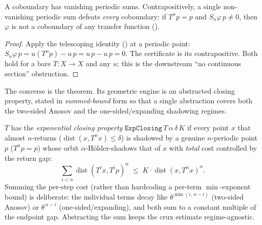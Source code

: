 \begin{theorem}\label{thm:livsic-trivial}
  \leanok
  A coboundary has vanishing periodic sums. Contrapositively, a single non-vanishing periodic sum
  defeats \emph{every} coboundary: if \(T^n p = p\) and \(S_n\varphi\,p\ne 0\), then \(\varphi\) is
  not a coboundary of any transfer function
  ().
\end{theorem}
\begin{proof}\leanok
  Apply the telescoping identity () at a periodic point:
  \(S_n\varphi\,p = u(T^n p) - u\,p = u\,p - u\,p = 0\). The certificate is its contrapositive.
  Both hold for a bare \(T:X\to X\) and any \(u\); this is the downstream ``no continuous section''
  obstruction.
\end{proof}

The converse is the theorem. Its geometric engine is an abstracted closing property, stated in
\emph{summed-bound} form so that a single abstraction covers both the two-sided Anosov and the
one-sided/expanding shadowing regimes.

\begin{definition}\label{def:livsic-expclosing}
  \leanok
  \(T\) has the \emph{exponential closing property} \(\texttt{ExpClosing}\,T\,\alpha\,\delta\,K\) if
  every point \(x\) that almost \(n\)-returns (\(\operatorname{dist}(x,T^n x)\le\delta\)) is shadowed by a genuine
  \(n\)-periodic point \(p\) (\(T^n p = p\)) whose orbit \(\alpha\)-Hölder-shadows that of \(x\) with
  \emph{total} cost controlled by the return gap:
  \[
    \sum_{i<n}\operatorname{dist}(T^i x, T^i p)^{\alpha} \;\le\; K\cdot\operatorname{dist}(x,T^n x)^{\alpha}.
  \]
  Summing the per-step cost (rather than hardcoding a per-term \(\min\)-exponent bound) is
  deliberate: the individual terms decay like \(\theta^{\min(i,\,n-i)}\) (two-sided Anosov) or
  \(\theta^{\,n-i}\) (one-sided/expanding), and both sum to a constant multiple of the endpoint gap.
  Abstracting the sum keeps the crux estimate regime-agnostic.
\end{definition}

